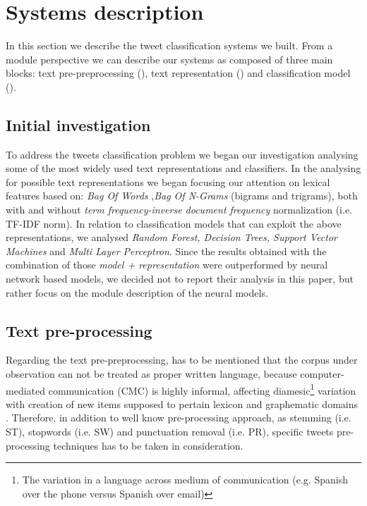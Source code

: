 \section{Systems description} \label{sec:system}

In this section we describe the tweet classification systems we built. From a module perspective we can describe our systems as composed of three main blocks: text pre-preprocessing (),  text representation () and classification model (). 


\subsection{Initial investigation} \label{subsec:boh}
To address the tweets classification problem we began our investigation analysing some of the most widely used text representations and classifiers.
In the analysing for possible text representations we began focusing our attention on lexical features based on: \emph{Bag Of Words} \cite{harris1954distributional},\emph{Bag Of N-Grams} (bigrams and trigrams), both with and without \emph{term frequency-inverse document frequency} normalization (i.e. TF-IDF norm).
In relation to classification models that can exploit the above representations,  we analysed \emph{Random Forest, Decision Trees, Support Vector Machines} and \emph{Multi Layer Perceptron}. Since the results obtained with the combination of those \emph{model + representation} were outperformed by neural network based models, we decided not to report their analysis in this paper, but rather focus on the module description of the neural models.


\subsection{Text pre-processing} \label{subsec:preprocessing}
Regarding the text pre-preprocessing, has to be mentioned that the corpus under observation can not be treated as proper written language, because computer-mediated communication (CMC) is highly informal, affecting diamesic\footnote{The variation in a language across medium of communication (e.g. Spanish over the phone versus Spanish over email)} variation with creation of new items supposed to pertain lexicon and graphematic domains \cite{bazzanella2011oscillazioni,cerruti2013netspeak}.
Therefore, in addition to well know pre-processing approach, as stemming (i.e. ST), stopwords (i.e. SW) and punctuation removal (i.e. PR), specific tweets pre-processing techniques has to be taken in consideration.

